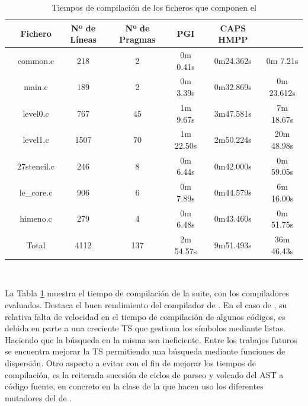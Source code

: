 \begin{table}[htb]
\caption{Tiempos de compilación de los ficheros que componen el \benchmark{}}
\label{table:epccBS:compilation}
\newcommand{\m}{\hphantom{$-$}}
\renewcommand{\tabcolsep}{4pt} %
\renewcommand{\arraystretch}{1.2} %
\centering
\begin{tabular}{@{}ccccccc}
\hline 
       & Fichero  & Nº de Líneas & Nº de Pragmas &  PGI & CAPS HMPP    & \accULL{} \\ \hline
      &  common.c    & 218 & 2 &  0m 0.41s  &  0m24.362s  &  0m 7.21s   \\ \hline
      &  main.c      & 189 & 2 &  0m 3.39s  &  0m32.869s  &  0m 23.612s  \\ \hline
      &  level0.c    & 767 & 45 &  1m 9.67s  &  3m47.581s  &  7m 18.67s  \\ \hline
      &  level1.c    & 1507 & 70 &  1m 22.50s &  2m50.224s  &  20m 48.98s \\ \hline
      &  27stencil.c & 246 & 8 &  0m 6.44s  &  0m42.000s  &  0m 59.05s  \\ \hline
      &  le\_core.c   & 906 & 6 &  0m 7.89s  &  0m44.579s  &  6m 16.00s  \\ \hline
      &  himeno.c    & 279 & 4 &  0m 6.48s  &  0m43.460s  &  0m 51.75s  \\ \hline
      &  Total        & 4112 & 137 &  2m 54.57s &  9m51.493s  &  36m 46.43s \\ \hline
\end{tabular}\\[2pt]
\end{table}

La Tabla \ref{table:epccBS:compilation} muestra el tiempo de compilación de la suite,
con los compiladores evaluados. Destaca el buen rendimiento del compilador de \PGI{}.
En el caso de \accULL{}, su relativa falta de velocidad en el tiempo de compilación
de algunos códigos, es debida en parte a una creciente \acf{TS} que gestiona los símbolos
mediante listas. Haciendo que la búsqueda en la misma sea ineficiente. 
Entre los trabajos futuros se encuentra mejorar la \ac{TS} permitiendo una búsqueda 
mediante funciones de dispersión.
Otro aspecto a evitar con el fin de mejorar los tiempos de compilación, es la
reiterada sucesión de ciclos de parseo y volcado del AST a código fuente, en concreto
en la clase  de la que hacen uso los diferentes mutadores del \backend{}
de .


